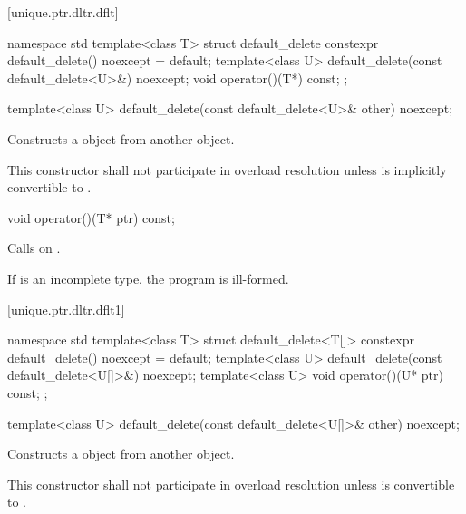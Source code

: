 [unique.ptr.dltr.dflt]{}

\begin{codeblock}
namespace std {
  template<class T> struct default_delete {
    constexpr default_delete() noexcept = default;
    template<class U> default_delete(const default_delete<U>&) noexcept;
    void operator()(T*) const;
  };
}
\end{codeblock}

%
\begin{itemdecl}
template<class U> default_delete(const default_delete<U>& other) noexcept;
\end{itemdecl}

\begin{itemdescr}
\pnum
\effects Constructs a  object
from another  object.

\pnum
\remarks This constructor shall not participate in overload resolution unless
 is implicitly convertible to .
\end{itemdescr}

%
\begin{itemdecl}
void operator()(T* ptr) const;
\end{itemdecl}

\begin{itemdescr}
\pnum
\effects Calls  on .

\pnum
\remarks If  is an incomplete type, the program is ill-formed.
\end{itemdescr}

[unique.ptr.dltr.dflt1]{}

\begin{codeblock}
namespace std {
  template<class T> struct default_delete<T[]> {
    constexpr default_delete() noexcept = default;
    template<class U> default_delete(const default_delete<U[]>&) noexcept;
    template<class U> void operator()(U* ptr) const;
  };
}
\end{codeblock}

\begin{itemdecl}
template<class U> default_delete(const default_delete<U[]>& other) noexcept;
\end{itemdecl}

\begin{itemdescr}
\pnum
\effects
Constructs a  object from another  object.

\pnum
\remarks
This constructor shall not participate in overload resolution unless  is
convertible to .
\end{itemdescr}


